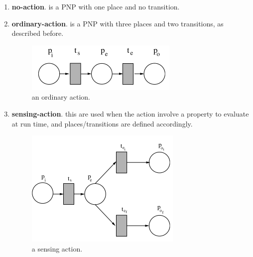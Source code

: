 \documentclass[pdftex,12pt,a4paper]{report}
\begin{document}
\begin{enumerate}
\item \textbf{no-action}. is a PNP with one place and no transition.
\item \textbf{ordinary-action}. is a PNP with three places and two transitions, as described before.
\begin{figure}[H]
	\centering
	\includegraphics[scale=0.5]{images/ordinary_action.png}
	\caption{an ordinary action.}
\end{figure}
\item \textbf{sensing-action}. this are used when the action involve a property to evaluate at run time, and places/transitions are defined accordingly.
\begin{figure}[H]
	\centering
	\includegraphics[scale=0.5]{images/sensing_action.png}
	\caption{a sensing action.}
\end{figure}
\end{enumerate}
\end{document}
